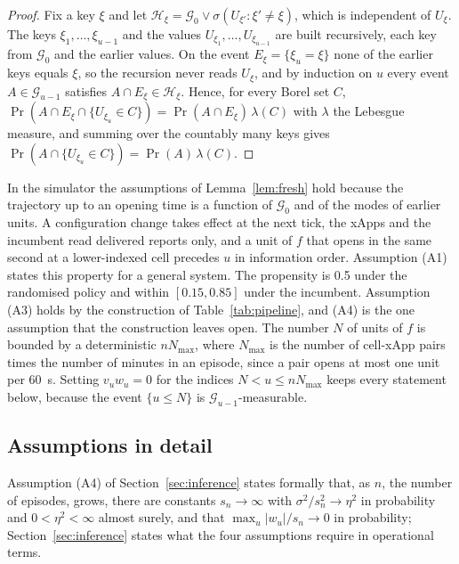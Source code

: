 \begin{proof}
Fix a key $\xi$ and let $\mathcal{H}_\xi = \mathcal{G}_0 \vee \sigma(U_{\xi'} : \xi' \ne \xi)$,
which is independent of $U_\xi$. The keys $\xi_1, \dots, \xi_{u-1}$ and the values
$U_{\xi_1}, \dots, U_{\xi_{u-1}}$ are built recursively, each key from $\mathcal{G}_0$ and the
earlier values. On the event $E_\xi = \{\xi_u = \xi\}$ none of the earlier keys equals
$\xi$, so the recursion never reads $U_\xi$, and by induction on $u$ every event
$A \in \mathcal{G}_{u-1}$ satisfies $A \cap E_\xi \in \mathcal{H}_\xi$. Hence, for every Borel
set $C$,
$\Pr(A \cap E_\xi \cap \{U_{\xi_u} \in C\}) = \Pr(A \cap E_\xi)\, \lambda(C)$ with
$\lambda$ the Lebesgue measure, and summing over the countably many keys gives
$\Pr(A \cap \{U_{\xi_u} \in C\}) = \Pr(A)\, \lambda(C)$.
\end{proof}

In the simulator the assumptions of Lemma~\ref{lem:fresh} hold because the trajectory up to an
opening time is a function of $\mathcal{G}_0$ and of the modes of earlier units. A configuration change takes effect at the next tick, the xApps and the incumbent read delivered reports only, and
a unit of $f$ that opens in the same second at a lower-indexed cell precedes $u$ in information
order. Assumption (A1) states this property for a general system. The propensity is 0.5 under the randomised
policy and within $[0.15, 0.85]$ under the incumbent.
Assumption (A3) holds by the construction of Table~\ref{tab:pipeline}, and (A4) is the one assumption that the
construction leaves open.
 The number $N$ of units of $f$ is
bounded by a deterministic $n N_{\max}$, where $N_{\max}$ is the number of cell-xApp pairs times the number of
minutes in an episode, since a pair opens at most one unit per 60~s. Setting $v_u w_u = 0$ for the indices
$N < u \le n N_{\max}$ keeps every statement below, because the event
$\{u \le N\}$ is $\mathcal{G}_{u-1}$-measurable.

\subsection{Assumptions in detail}
\label{app:assumptions}

Assumption (A4) of Section~\ref{sec:inference} states formally that, as $n$, the number of episodes, grows, there are constants $s_n \to \infty$ with $\sigma^2 / s_n^2 \to \eta^2$ in probability and
$0 < \eta^2 < \infty$ almost surely, and that $\max_u |w_u| / s_n \to 0$ in probability; Section~\ref{sec:inference} states what the four assumptions require in operational terms.

